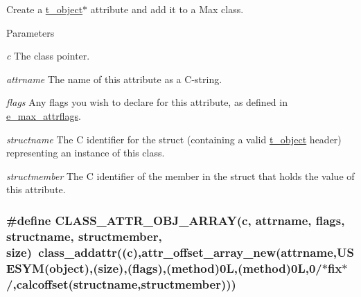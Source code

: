 Create a \hyperlink{structt__object}{t\_\-object}$\ast$ attribute and add it to a Max class. 
\begin{DoxyParams}{Parameters}
\item[{\em c}]The class pointer. \item[{\em attrname}]The name of this attribute as a C-\/string. \item[{\em flags}]Any flags you wish to declare for this attribute, as defined in \hyperlink{group__attr_gaf296cfc6741bb19207f6ed8062809115}{e\_\-max\_\-attrflags}. \item[{\em structname}]The C identifier for the struct (containing a valid \hyperlink{structt__object}{t\_\-object} header) representing an instance of this class. \item[{\em structmember}]The C identifier of the member in the struct that holds the value of this attribute. \end{DoxyParams}
\hypertarget{group__attr_gac4ac2f09318920332814d5686ca914e0}{
\subsubsection[{CLASS\_\-ATTR\_\-OBJ\_\-ARRAY}]{\setlength{\rightskip}{0pt plus 5cm}\#define CLASS\_\-ATTR\_\-OBJ\_\-ARRAY(c, \/  attrname, \/  flags, \/  structname, \/  structmember, \/  size)~class\_\-addattr((c),attr\_\-offset\_\-array\_\-new(attrname,USESYM(object),(size),(flags),({\bf method})0L,(method)0L,0/$\ast$fix$\ast$/,calcoffset(structname,structmember)))}}
\label{group__attr_gac4ac2f09318920332814d5686ca914e0}


